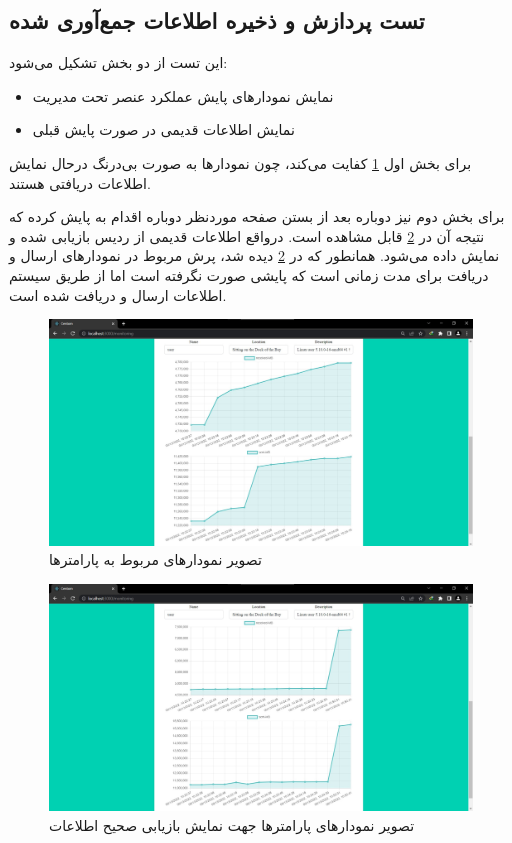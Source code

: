 \subsection{تست پردازش و ذخیره اطلاعات جمع‌آوری شده}

این تست از دو بخش تشکیل می‌شود:

\begin{itemize}
    \item نمایش نمودارهای پایش عملکرد عنصر تحت مدیریت
    \item نمایش اطلاعات قدیمی در صورت پایش قبلی
\end{itemize}

برای بخش اول \cref{fig.53} کفایت می‌کند، چون نمودارها به صورت بی‌درنگ درحال نمایش اطلاعات دریافتی هستند.


برای بخش دوم نیز دوباره بعد از بستن صفحه موردنظر دوباره اقدام به پایش کرده که نتیجه آن در \cref{fig.54} قابل مشاهده است. درواقع اطلاعات قدیمی از ردیس بازیابی شده و نمایش داده می‌شود. همانطور که در \cref{fig.54} دیده شد، پرش مربوط در نمودارهای ارسال و دریافت برای مدت زمانی است که پایشی صورت نگرفته است اما از طریق سیستم اطلاعات ارسال و دریافت شده است.

\begin{figure}[!h]
    \centering\includegraphics[scale=.38]{./monitoring-before}
    \caption{تصویر نمودارهای مربوط به پارامترها}\label{fig.53}
\end{figure}


\begin{figure}[!h]
    \centering\includegraphics[scale=.38]{./monitoring-after}
    \caption{تصویر نمودارهای پارامترها جهت نمایش بازیابی صحیح اطلاعات}\label{fig.54}
\end{figure}



